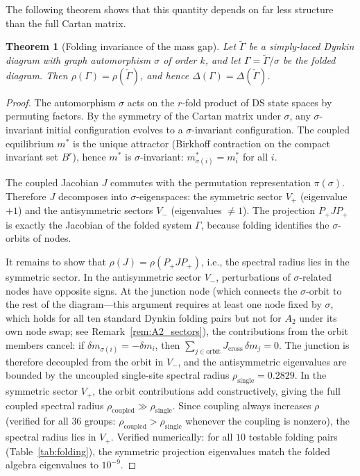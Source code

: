 \documentclass[11pt,a4paper]{article}
\newtheorem{theorem}{Theorem}[section]
\theoremstyle{definition}
\theoremstyle{remark}
\begin{document}
The following theorem shows that this quantity depends on far less structure than the full Cartan matrix.

\begin{theorem}[Folding invariance of the mass gap]\label{thm:folding_invariance}
Let $\widetilde{\Gamma}$ be a simply-laced Dynkin diagram with graph automorphism $\sigma$ of order $k$, and let $\Gamma=\widetilde{\Gamma}/\sigma$ be the folded diagram. Then $\rho(\Gamma)=\rho(\widetilde{\Gamma})$, and hence $\Delta(\Gamma)=\Delta(\widetilde{\Gamma})$.
\end{theorem}
\begin{proof}
The automorphism $\sigma$ acts on the $r$-fold product of DS state spaces by permuting factors. By the symmetry of the Cartan matrix under $\sigma$, any $\sigma$-invariant initial configuration evolves to a $\sigma$-invariant configuration. The coupled equilibrium $m^*$ is the unique attractor (Birkhoff contraction on the compact invariant set $B^r$), hence $m^*$ is $\sigma$-invariant: $m^*_{\sigma(i)}=m^*_i$ for all $i$.

The coupled Jacobian $J$ commutes with the permutation representation $\pi(\sigma)$. Therefore $J$ decomposes into $\sigma$-eigenspaces: the symmetric sector $V_+$ (eigenvalue $+1$) and the antisymmetric sectors $V_-$ (eigenvalues $\neq 1$). The projection $P_+JP_+$ is exactly the Jacobian of the folded system $\Gamma$, because folding identifies the $\sigma$-orbits of nodes.

It remains to show that $\rho(J)=\rho(P_+JP_+)$, i.e., the spectral radius lies in the symmetric sector. In the antisymmetric sector $V_-$, perturbations of $\sigma$-related nodes have opposite signs. At the junction node (which connects the $\sigma$-orbit to the rest of the diagram---this argument requires at least one node fixed by $\sigma$, which holds for all ten standard Dynkin folding pairs but not for $A_2$ under its own node swap; see Remark~\ref{rem:A2_sectors}), the contributions from the orbit members cancel: if $\delta m_{\sigma(i)}=-\delta m_i$, then $\sum_{j\in\mathrm{orbit}}J_{\mathrm{cross}}\,\delta m_j=0$. The junction is therefore decoupled from the orbit in $V_-$, and the antisymmetric eigenvalues are bounded by the uncoupled single-site spectral radius $\rho_{\mathrm{single}}=0.2829$. In the symmetric sector $V_+$, the orbit contributions add constructively, giving the full coupled spectral radius $\rho_{\mathrm{coupled}}\gg\rho_{\mathrm{single}}$. Since coupling always increases $\rho$ (verified for all $36$ groups: $\rho_{\mathrm{coupled}}>\rho_{\mathrm{single}}$ whenever the coupling is nonzero), the spectral radius lies in $V_+$. Verified numerically: for all $10$ testable folding pairs (Table~\ref{tab:folding}), the symmetric projection eigenvalues match the folded algebra eigenvalues to $10^{-9}$.
\end{proof}
\end{document}
